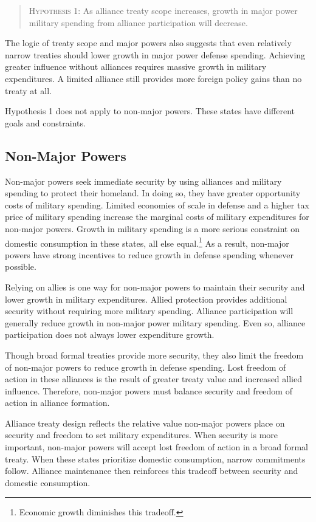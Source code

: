 \documentclass[12pt]{article}
\begin{document}
\begin{quote}
\textsc{Hypothesis 1}: As alliance treaty scope increases, growth in major power military spending from alliance participation will decrease. 
\end{quote}


The logic of treaty scope and major powers also suggests that even relatively narrow treaties should lower growth in major power defense spending. 
Achieving greater influence without alliances requires massive growth in military expenditures. 
A limited alliance still provides more foreign policy gains than no treaty at all. 


Hypothesis 1 does not apply to non-major powers. 
These states have different goals and constraints. 


\subsection{Non-Major Powers} 


Non-major powers seek immediate security by using alliances and military spending to protect their homeland.  
In doing so, they have greater opportunity costs of military spending. 
Limited economies of scale in defense and a higher tax price of military spending increase the marginal costs of military expenditures for non-major powers. 
Growth in military spending is a more serious constraint on domestic consumption in these states, all else equal.\footnote{Economic growth diminishes this tradeoff.} 
As a result, non-major powers have strong incentives to reduce growth in defense spending whenever possible.


Relying on allies is one way for non-major powers to maintain their security and lower growth in military expenditures.  
Allied protection provides additional security without requiring more military spending. 
Alliance participation will generally reduce growth in non-major power military spending. 
Even so, alliance participation does not always lower expenditure growth.


Though broad formal treaties provide more security, they also limit the freedom of non-major powers to reduce growth in defense spending.
Lost freedom of action in these alliances is the result of greater treaty value and increased allied influence. 
Therefore, non-major powers must balance security and freedom of action in alliance formation. 


Alliance treaty design reflects the relative value non-major powers place on security and freedom to set military expenditures. 
When security is more important, non-major powers will accept lost freedom of action in a broad formal treaty.
When these states prioritize domestic consumption, narrow commitments follow. 
Alliance maintenance then reinforces this tradeoff between security and domestic consumption. 
\end{document}
